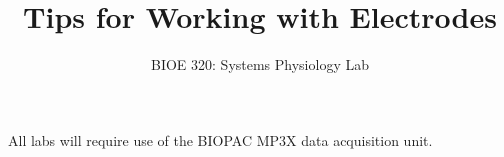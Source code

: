 \documentclass{article}
\title{Tips for Working with Electrodes}
\author{BIOE 320: Systems Physiology Lab}
\date{}
\begin{document}
\maketitle
\begin{info}
All labs will require use of the BIOPAC MP3X data acquisition unit.
\end{info}
\end{document}
